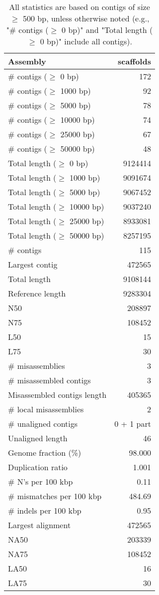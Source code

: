 \documentclass[12pt,a4paper]{article}
\begin{document}
\begin{table}[ht]
\begin{center}
\caption{All statistics are based on contigs of size $\geq$ 500 bp, unless otherwise noted (e.g., "\# contigs ($\geq$ 0 bp)" and "Total length ($\geq$ 0 bp)" include all contigs).}
\begin{tabular}{|l*{1}{|r}|}
\hline
Assembly & scaffolds \\ \hline
\# contigs ($\geq$ 0 bp) & 172 \\ \hline
\# contigs ($\geq$ 1000 bp) & 92 \\ \hline
\# contigs ($\geq$ 5000 bp) & 78 \\ \hline
\# contigs ($\geq$ 10000 bp) & 74 \\ \hline
\# contigs ($\geq$ 25000 bp) & 67 \\ \hline
\# contigs ($\geq$ 50000 bp) & 48 \\ \hline
Total length ($\geq$ 0 bp) & 9124414 \\ \hline
Total length ($\geq$ 1000 bp) & 9091674 \\ \hline
Total length ($\geq$ 5000 bp) & 9067452 \\ \hline
Total length ($\geq$ 10000 bp) & 9037240 \\ \hline
Total length ($\geq$ 25000 bp) & 8933081 \\ \hline
Total length ($\geq$ 50000 bp) & 8257195 \\ \hline
\# contigs & 115 \\ \hline
Largest contig & 472565 \\ \hline
Total length & 9108144 \\ \hline
Reference length & 9283304 \\ \hline
N50 & 208897 \\ \hline
N75 & 108452 \\ \hline
L50 & 15 \\ \hline
L75 & 30 \\ \hline
\# misassemblies & 3 \\ \hline
\# misassembled contigs & 3 \\ \hline
Misassembled contigs length & 405365 \\ \hline
\# local misassemblies & 2 \\ \hline
\# unaligned contigs & 0 + 1 part \\ \hline
Unaligned length & 46 \\ \hline
Genome fraction (\%) & 98.000 \\ \hline
Duplication ratio & 1.001 \\ \hline
\# N's per 100 kbp & 0.11 \\ \hline
\# mismatches per 100 kbp & 484.69 \\ \hline
\# indels per 100 kbp & 0.95 \\ \hline
Largest alignment & 472565 \\ \hline
NA50 & 203339 \\ \hline
NA75 & 108452 \\ \hline
LA50 & 16 \\ \hline
LA75 & 30 \\ \hline
\end{tabular}
\end{center}
\end{table}
\end{document}
